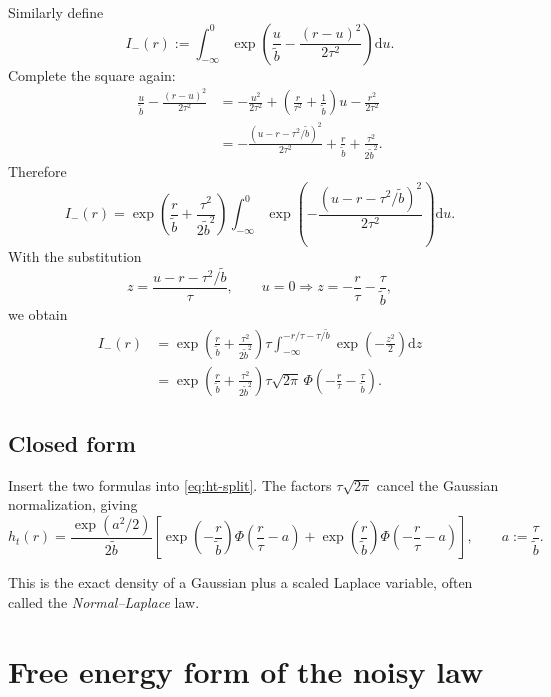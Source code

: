 \documentclass[11pt]{article}
\newcommand{\dd}{\mathrm{d}}
\newcommand{\1}{\mathbf{1}}
\newcommand{\Ph}{\Phi}
\theoremstyle{definition}
\begin{document}
Similarly define
\begin{equation}
I_-(r):=\int_{-\infty}^{0} \exp\!\left(\frac{u}{\tilde b}-\frac{(r-u)^2}{2\tau^2}\right)\dd u.
\end{equation}
Complete the square again:
\begin{align}
\frac{u}{\tilde b}-\frac{(r-u)^2}{2\tau^2}
&= -\frac{u^2}{2\tau^2}+\left(\frac{r}{\tau^2}+\frac{1}{\tilde b}\right)u-\frac{r^2}{2\tau^2} \\
&= -\frac{(u-r-\tau^2/\tilde b)^2}{2\tau^2} + \frac{r}{\tilde b}+\frac{\tau^2}{2\tilde b^2}.
\end{align}
Therefore
\begin{equation}
I_-(r)=\exp\!\left(\frac{r}{\tilde b}+\frac{\tau^2}{2\tilde b^2}\right)
\int_{-\infty}^{0}
\exp\!\left(-\frac{(u-r-\tau^2/\tilde b)^2}{2\tau^2}\right)
\dd u.
\end{equation}
With the substitution
\begin{equation}
z=\frac{u-r-\tau^2/\tilde b}{\tau},
\qquad
u=0 \Longrightarrow z = -\frac{r}{\tau}-\frac{\tau}{\tilde b},
\end{equation}
we obtain
\begin{align}
I_-(r)
&= \exp\!\left(\frac{r}{\tilde b}+\frac{\tau^2}{2\tilde b^2}\right)
\tau\int_{-\infty}^{-r/\tau-\tau/\tilde b}\exp\!\left(-\frac{z^2}{2}\right)\dd z \\
&= \exp\!\left(\frac{r}{\tilde b}+\frac{\tau^2}{2\tilde b^2}\right)
\tau\sqrt{2\pi}\, \Ph\!\left(-\frac{r}{\tau}-\frac{\tau}{\tilde b}\right).
\end{align}

\subsection{Closed form}

Insert the two formulas into \eqref{eq:ht-split}. The factors \(\tau\sqrt{2\pi}\) cancel the Gaussian normalization, giving
\begin{equation}
\label{eq:ht-closed-form}
\boxed{
h_t(r)=\frac{\exp(a^2/2)}{2\tilde b}
\left[
\exp\!\left(-\frac{r}{\tilde b}\right)\Ph\!\left(\frac{r}{\tau}-a\right)
+
\exp\!\left(\frac{r}{\tilde b}\right)\Ph\!\left(-\frac{r}{\tau}-a\right)
\right],
\qquad
a:=\frac{\tau}{\tilde b}.
}
\end{equation}

This is the exact density of a Gaussian plus a scaled Laplace variable, often called the \emph{Normal--Laplace} law.

\section{Free energy form of the noisy law}
\end{document}
